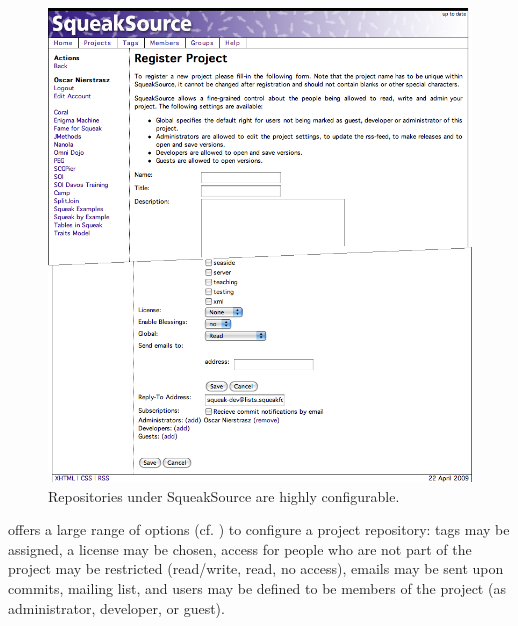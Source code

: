 \documentclass[a4paper,10pt,twoside]{book}
\begin{document}
\begin{figure}[ht]\centering
	\includegraphics[width=.80\textwidth]{squeaksourcesetting}
	\caption{Repositories under SqueakSource are highly configurable.}
\end{figure}

\MC offers a large range of options (cf. ) to configure a project repository: tags may be assigned, a license may be chosen, access for people who are not part of the project may be restricted (read/write, read, no access), emails may be sent upon commits, mailing list, and users may be defined to be members of the project (as administrator, developer, or guest).

\end{document}

